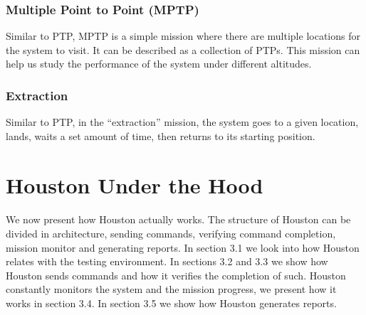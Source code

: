 \documentclass[11pt, a4paper]{article}
\begin{document}
\subsubsection{Multiple Point to Point (MPTP)}
Similar to PTP, MPTP is a simple mission where there are multiple locations for the system to visit. It can be described as a collection of PTPs. This mission can help us study the performance of the system under different altitudes.
\subsubsection{Extraction}
Similar to PTP, in the “extraction” mission, the system goes to a given location, lands, waits a set amount of time, then returns to its starting position.
\section{Houston Under the Hood }
\paragraph{}
We now present how Houston actually works. The structure of Houston can be divided in architecture, sending commands, verifying command completion, mission monitor and generating reports. In section 3.1 we look into how Houston relates with the testing environment. In sections 3.2 and 3.3 we show how Houston sends commands and how it verifies the completion of such. Houston constantly monitors the system and the mission progress, we present how it works in section 3.4. In section 3.5 we show how Houston generates reports. 
\end{document}
